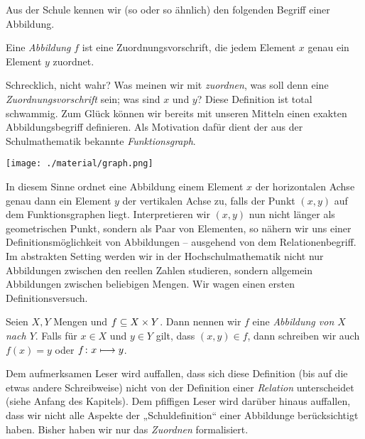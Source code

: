 
Aus der Schule kennen wir (so oder so ähnlich) den folgenden Begriff einer
Abbildung.

\begin{definn}
  Eine \emph{Abbildung} $f$ ist eine Zuordnungsvorschrift, die
  jedem Element $x$ genau ein Element $y$ zuordnet.
\end{definn}

Schrecklich, nicht wahr? Was meinen wir mit \emph{zuordnen}, was soll denn eine
\emph{Zuordnungsvorschrift} sein; was sind $x$ und $y$? Diese Definition ist
total schwammig. Zum Glück können wir bereits mit unseren Mitteln einen exakten
Abbildungsbegriff definieren. Als Motivation dafür dient der aus der
Schulmathematik bekannte \emph{Funktionsgraph}.


\begin{center}
  \texttt{[image: ./material/graph.png]}
\end{center}


In diesem Sinne ordnet eine Abbildung einem Element $x$ der horizontalen Achse
genau dann ein Element $y$ der vertikalen Achse zu, falls der Punkt $(x, y)$ auf
dem Funktionsgraphen liegt. Interpretieren wir $(x, y)$ nun nicht länger als
geometrischen Punkt, sondern als Paar von Elementen, so nähern wir uns einer
Definitionsmöglichkeit von Abbildungen -- ausgehend von dem Relationenbegriff.
Im abstrakten Setting werden wir in der Hochschulmathematik nicht nur
Abbildungen zwischen den reellen Zahlen studieren, sondern allgemein Abbildungen
zwischen beliebigen Mengen. Wir wagen einen ersten Definitionsversuch.


\begin{definn}
  Seien $X,Y$ Mengen und $f \subseteq X\times Y$. Dann nennen wir $f$ eine
  \emph{Abbildung von $X$ nach $Y$}. Falls für $x\in X$ und $y\in Y$ gilt, dass
  $(x, y) \in f$, dann schreiben wir auch $f(x) = y$ oder $f\colon x \longmapsto y$.
\end{definn}


Dem aufmerksamen Leser wird auffallen, dass sich diese Definition (bis auf die
etwas andere Schreibweise) nicht von der Definition einer \emph{Relation}
unterscheidet (siehe Anfang des Kapitels). Dem pfiffigen Leser wird darüber
hinaus auffallen, dass wir nicht alle Aspekte der „Schuldefinition“ einer
Abbildunge berücksichtigt haben. Bisher haben wir nur das \emph{Zuordnen}
formalisiert.

